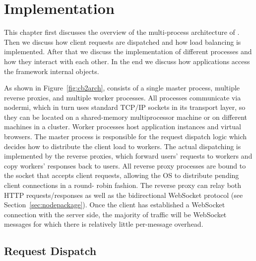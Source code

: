 \chapter{Implementation}
\label{ch:impl}

This chapter first discusses the overview of the multi-process architecture of \cbtwo.
Then we discuss how client requests are dispatched and how load balancing is implemented.
After that we discuss the implementation of different \cbtwo processes and how they interact
with each other.
In the end we discuss how \cb applications access the framework internal objects.



As shown in Figure~\ref{fig:cb2arch}, \cbtwo consists of a
single master process, multiple reverse proxies, and multiple worker
processes. All processes communicate via nodermi, which in turn uses standard TCP/IP 
sockets in its transport layer, so they can
be located on a shared-memory multiprocessor machine or on different machines in a cluster. 
Worker processes host application instances and virtual browsers. The master process is responsible for
the request dispatch logic which decides how to distribute the client load to
workers. The actual dispatching is implemented by the reverse proxies, which
forward users' requests to workers and copy workers' responses back to users.
All reverse proxy processes are bound to the socket that accepts client
requests, allowing the OS to distribute pending client connections in a round-
robin fashion.
The reverse proxy can relay both HTTP requests/responses as
well as the bidirectional WebSocket protocol (see Section~\ref{sec:nodepackage}).
Once the client has established a WebSocket connection with
the server side, the majority of traffic will be WebSocket
messages for which there is relatively little per-message overhead.

\newarchitectureoverview{}



\section{Request Dispatch}
\label{sec:reqdis}

